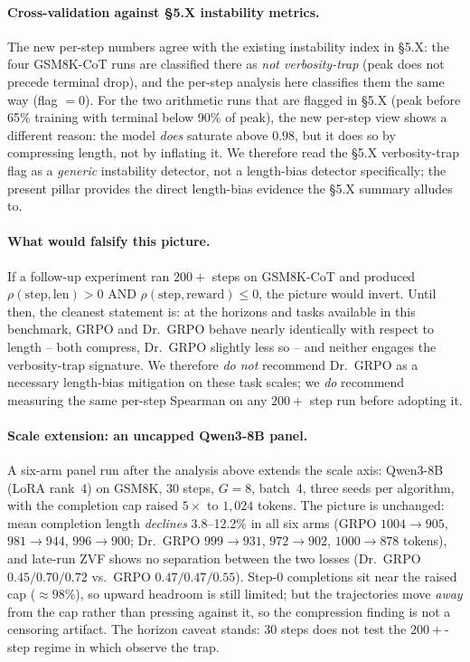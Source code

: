 \documentclass{article}
\begin{document}
\paragraph{Cross-validation against §5.X instability metrics.}
The new per-step numbers agree with the existing instability index
in §5.X: the four GSM8K-CoT runs are classified there as
\emph{not verbosity-trap} (peak does not precede terminal drop),
and the per-step analysis here classifies them the same way
(flag $=0$). For the two arithmetic runs that are flagged in
§5.X (peak before 65\% training with terminal below 90\% of
peak), the new per-step view shows a different reason: the model
\emph{does} saturate above $0.98$, but it does so by compressing
length, not by inflating it. We therefore read the §5.X verbosity-trap
flag as a \emph{generic} instability detector, not a length-bias
detector specifically; the present pillar provides the direct
length-bias evidence the §5.X summary alludes to.

\paragraph{What would falsify this picture.}
If a follow-up experiment ran $200{+}$ steps on GSM8K-CoT and
produced $\rho(\text{step},\text{len})>0$ AND
$\rho(\text{step},\text{reward})\le 0$, the picture would invert.
Until then, the cleanest statement is: at the horizons and tasks
available in this benchmark, GRPO and Dr.~GRPO behave nearly
identically with respect to length -- both compress, Dr.~GRPO
slightly less so -- and neither engages the verbosity-trap
signature. We therefore \emph{do not} recommend Dr.~GRPO as a
necessary length-bias mitigation on these task scales; we
\emph{do} recommend measuring the same per-step Spearman on any
$200{+}$ step run before adopting it.

\paragraph{Scale extension: an uncapped Qwen3-8B panel.}
A six-arm panel run after the analysis above extends the scale axis:
Qwen3-8B (LoRA rank~4) on GSM8K, $30$ steps, $G{=}8$, batch~4, three
seeds per algorithm, with the completion cap raised $5\times$ to
$1{,}024$ tokens. The picture is unchanged: mean completion length
\emph{declines} 3.8--12.2\% in all six arms (GRPO $1004{\to}905$,
$981{\to}944$, $996{\to}900$; Dr.~GRPO $999{\to}931$, $972{\to}902$,
$1000{\to}878$ tokens), and late-run ZVF shows no separation between the
two losses (Dr.~GRPO $0.45/0.70/0.72$ vs.\ GRPO $0.47/0.47/0.55$).
Step-0 completions sit near the raised cap ($\approx 98\%$), so upward
headroom is still limited; but the trajectories move \emph{away} from
the cap rather than pressing against it, so the compression finding is
not a censoring artifact. The horizon caveat stands: $30$ steps does not
test the $200{+}$-step regime in which \cite{tong2025drgrpo} observe the
trap.
\end{document}
